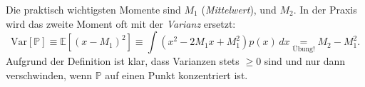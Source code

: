 Die praktisch wichtigsten Momente sind $M_1$ (\emph{Mittelwert}), und $M_2$. In der Praxis wird das zweite Moment oft mit der \emph{Varianz} ersetzt:
\begin{equation}
	\text{Var}[\mathbb{P}] \equiv \mathbb{E}[(x-M_1)^2] \equiv \int (x^2-2M_1 x +M_1^2) p(x)\, dx \underset{\text{Übung!}}{=} M_2-M_1^2.
\end{equation}
Aufgrund der Definition ist klar, dass Varianzen stets $\ge 0$ sind und nur dann verschwinden, wenn $\mathbb{P}$ auf einen Punkt konzentriert ist.
